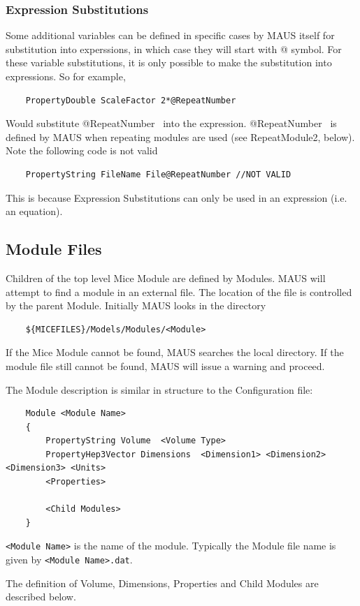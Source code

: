 \subsubsection{Expression Substitutions}
Some additional variables can be defined in specific cases by MAUS itself for substitution into experssions, in which
case they will start with @ symbol. For these variable substitutions, it is only possible to make the substitution into
expressions. So for example,
\begin{verbatim}
    PropertyDouble ScaleFactor 2*@RepeatNumber
\end{verbatim}
Would substitute @RepeatNumber \ into the expression. @RepeatNumber \ is defined by MAUS when repeating modules are
used (see RepeatModule2, below). Note the following code is not valid
\begin{verbatim}
    PropertyString FileName File@RepeatNumber //NOT VALID
\end{verbatim}
This is because Expression Substitutions can only be used in an expression (i.e. an equation).

\subsection[Module Files]{Module Files}
Children of the top level Mice Module are defined by Modules. MAUS will attempt to find a module in an external file.
The location of the file is controlled by the parent Module. Initially MAUS looks in the directory
\begin{verbatim}
    ${MICEFILES}/Models/Modules/<Module>
\end{verbatim}
If the Mice Module cannot be found, MAUS searches the local directory. If the module file still cannot be found,
MAUS will issue a warning and proceed.

The Module description is similar in structure to the Configuration file:
\begin{verbatim}
    Module <Module Name>
    {
        PropertyString Volume  <Volume Type>
        PropertyHep3Vector Dimensions  <Dimension1> <Dimension2> <Dimension3> <Units>
        <Properties>

        <Child Modules>
    }
\end{verbatim}
\verb|<Module Name>| is the name of the module. Typically the Module file name is given by
\verb|<Module Name>.dat|.

The definition of Volume, Dimensions, Properties and Child Modules are described below.


